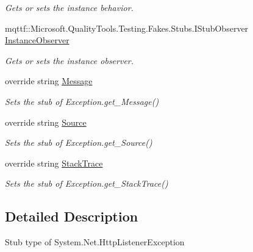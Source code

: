 \begin{DoxyCompactItemize}
\begin{DoxyCompactList}\small\item\em Gets or sets the instance behavior.\end{DoxyCompactList}\item 
mqttf\-::\-Microsoft.\-Quality\-Tools.\-Testing.\-Fakes.\-Stubs.\-I\-Stub\-Observer \hyperlink{class_system_1_1_net_1_1_fakes_1_1_stub_http_listener_exception_ad595690570d80b3ce9c3ba801ee7342c}{Instance\-Observer}
\begin{DoxyCompactList}\small\item\em Gets or sets the instance observer.\end{DoxyCompactList}\item 
override string \hyperlink{class_system_1_1_net_1_1_fakes_1_1_stub_http_listener_exception_a960e66969c5be5e791c753143bd52061}{Message}
\begin{DoxyCompactList}\small\item\em Sets the stub of Exception.\-get\-\_\-\-Message()\end{DoxyCompactList}\item 
override string \hyperlink{class_system_1_1_net_1_1_fakes_1_1_stub_http_listener_exception_ac5ecdd8e5f07e93ffd35b78af03da6d9}{Source}
\begin{DoxyCompactList}\small\item\em Sets the stub of Exception.\-get\-\_\-\-Source()\end{DoxyCompactList}\item 
override string \hyperlink{class_system_1_1_net_1_1_fakes_1_1_stub_http_listener_exception_aacb9a45cf4db35f5d7f35c98e3ba6c66}{Stack\-Trace}
\begin{DoxyCompactList}\small\item\em Sets the stub of Exception.\-get\-\_\-\-Stack\-Trace()\end{DoxyCompactList}\end{DoxyCompactItemize}


\subsection{Detailed Description}
Stub type of System.\-Net.\-Http\-Listener\-Exception



